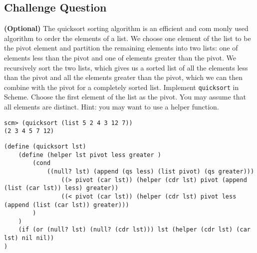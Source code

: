 \begin{blocksection}
\section{Challenge Question}
\question \textbf{(Optional)} The quicksort sorting algorithm is an efficient and com
monly used algorithm to
order the elements of a list. We choose one element of the list to be the pivot
element and partition the remaining elements into two lists: one of elements less
than the pivot and one of elements greater than the pivot. We recursively sort the
two lists, which gives us a sorted list of all the elements less than the pivot and all
the elements greater than the pivot, which we can then combine with the pivot for
a completely sorted list.
\newline
\newline
Implement \texttt{quicksort} in Scheme. Choose the first element of the list
as the pivot. You may assume that all elements are distinct. Hint: you may want to use a helper function.

\begin{lstlisting}
scm> (quicksort (list 5 2 4 3 12 7))
(2 3 4 5 7 12)
\end{lstlisting}

\begin{solution}[0.5in]
\begin{lstlisting}
(define (quicksort lst)
    (define (helper lst pivot less greater )
        (cond
            ((null? lst) (append (qs less) (list pivot) (qs greater)))
                ((> pivot (car lst)) (helper (cdr lst) pivot (append (list (car lst)) less) greater))
                ((< pivot (car lst)) (helper (cdr lst) pivot less (append (list (car lst)) greater)))
        )
    )
    (if (or (null? lst) (null? (cdr lst))) lst (helper (cdr lst) (car lst) nil nil))
)
\end{lstlisting}

\end{solution}
\end{blocksection}
